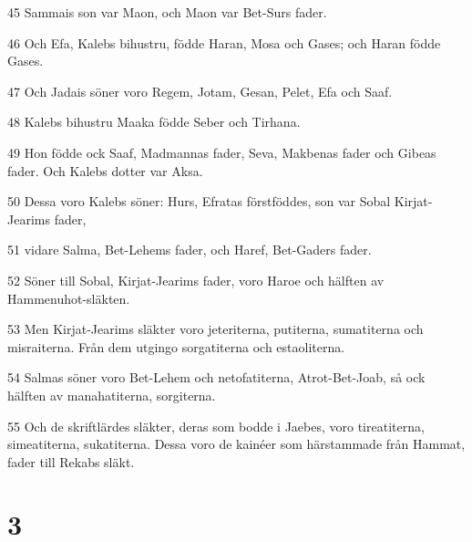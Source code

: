 \par 45 Sammais son var Maon, och Maon var Bet-Surs fader.
\par 46 Och Efa, Kalebs bihustru, födde Haran, Mosa och Gases; och Haran födde Gases.
\par 47 Och Jadais söner voro Regem, Jotam, Gesan, Pelet, Efa och Saaf.
\par 48 Kalebs bihustru Maaka födde Seber och Tirhana.
\par 49 Hon födde ock Saaf, Madmannas fader, Seva, Makbenas fader och Gibeas fader. Och Kalebs dotter var Aksa.
\par 50 Dessa voro Kalebs söner: Hurs, Efratas förstföddes, son var Sobal Kirjat-Jearims fader,
\par 51 vidare Salma, Bet-Lehems fader, och Haref, Bet-Gaders fader.
\par 52 Söner till Sobal, Kirjat-Jearims fader, voro Haroe och hälften av Hammenuhot-släkten.
\par 53 Men Kirjat-Jearims släkter voro jeteriterna, putiterna, sumatiterna och misraiterna. Från dem utgingo sorgatiterna och estaoliterna.
\par 54 Salmas söner voro Bet-Lehem och netofatiterna, Atrot-Bet-Joab, så ock hälften av manahatiterna, sorgiterna.
\par 55 Och de skriftlärdes släkter, deras som bodde i Jaebes, voro tireatiterna, simeatiterna, sukatiterna. Dessa voro de kainéer som härstammade från Hammat, fader till Rekabs släkt.

\chapter{3}

